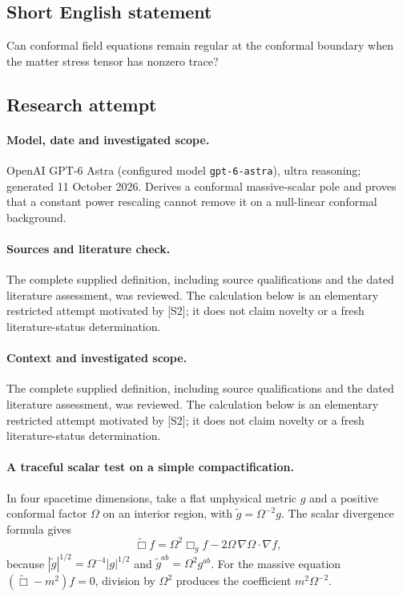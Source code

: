 \documentclass[11pt]{article}
\begin{document}
\subsection{Short English statement}
Can conformal field equations remain regular at the conformal boundary when the matter stress tensor has nonzero trace?
\subsection{Research attempt}
\paragraph{Model, date and investigated scope.}
OpenAI GPT-6 Astra (configured model \texttt{gpt-6-astra}), ultra reasoning; generated 11 October 2026. Derives a conformal massive-scalar pole and proves that a constant power rescaling cannot remove it on a null-linear conformal background.

\paragraph{Sources and literature check.}
The complete supplied definition, including source qualifications and the dated literature assessment, was reviewed. The calculation below is an elementary restricted attempt motivated by [S2]; it does not claim novelty or a fresh literature-status determination.

\paragraph{Context and investigated scope.} The complete supplied definition, including source qualifications and the dated literature assessment, was reviewed. The calculation below is an elementary restricted attempt motivated by [S2]; it does not claim novelty or a fresh literature-status determination.

\paragraph{A traceful scalar test on a simple compactification.} In four spacetime dimensions, take a flat unphysical metric $g$ and a positive conformal factor $\Omega$ on an interior region, with $\widetilde g=\Omega^{-2}g$. The scalar divergence formula gives
\[
 \widetilde\Box f=\Omega^2\Box_gf-2\Omega\,\nabla\Omega\cdot\nabla f,
\]
because $|\widetilde g|^{1/2}=\Omega^{-4}|g|^{1/2}$ and $\widetilde g^{ab}=\Omega^2g^{ab}$. For the massive equation $(\widetilde\Box-m^2)f=0$, division by $\Omega^2$ produces the coefficient $m^2\Omega^{-2}$.
\end{document}
